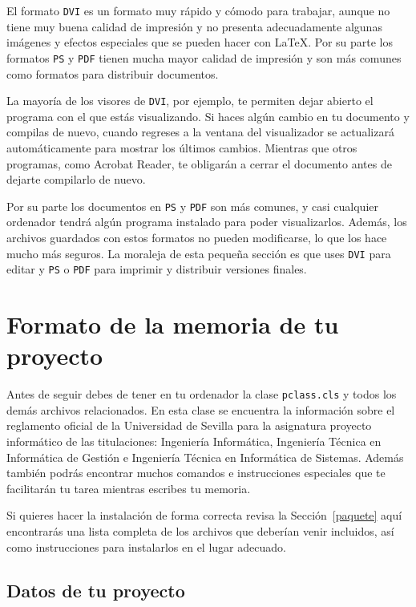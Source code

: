 El formato \texttt{DVI} es un formato muy r\'apido y c\'omodo para trabajar,
aunque no tiene muy buena calidad de impresi\'on y no presenta adecuadamente
algunas im\'agenes y efectos especiales que se pueden hacer con \LaTeX{}.
Por su parte los formatos \texttt{PS} y \texttt{PDF} tienen mucha mayor calidad
de impresi\'on y son m\'as comunes como formatos para distribuir documentos.

La mayor\'ia de los visores de \texttt{DVI}, por ejemplo, te permiten dejar abierto
el programa con el que est\'as visualizando. Si haces alg\'un cambio en tu
documento y compilas de nuevo, cuando regreses a la ventana del visualizador se
actualizar\'a autom\'aticamente para mostrar los \'ultimos cambios. Mientras
que otros programas, como Acrobat Reader, te obligar\'an a cerrar el
documento antes de dejarte compilarlo de nuevo.

Por su parte los documentos en \texttt{PS} y \texttt{PDF} son m\'as comunes, y casi
cualquier ordenador tendr\'a alg\'un programa instalado para poder
visualizarlos. Adem\'as, los archivos guardados con estos formatos no pueden
modificarse, lo que los hace mucho m\'as seguros. La moraleja de esta peque\~na
secci\'on es que uses \texttt{DVI} para editar y \texttt{PS} o \texttt{PDF} para
imprimir y distribuir versiones finales.



\section{Formato de la memoria de tu proyecto}

Antes de seguir debes de tener en tu ordenador la clase \texttt{pclass.cls} y  todos los 
dem\'as archivos relacionados. En esta clase se encuentra la informaci\'on sobre el reglamento oficial de la Universidad de 
Sevilla para la asignatura proyecto inform\'atico de las titulaciones: Ingenier\'ia Inform\'atica, Ingenier\'ia T\'ecnica 
en Inform\'atica de Gesti\'on e Ingenier\'ia T\'ecnica en Inform\'atica de Sistemas. Adem\'as tambi\'en podr\'as encontrar
muchos comandos e instrucciones especiales que te facilitar\'an tu tarea mientras escribes tu memoria.

Si quieres hacer la instalaci\'on de forma correcta revisa la Secci\'on~\ref{paquete} aqu\'i encontrar\'as
una lista completa de los archivos que deber\'ian venir incluidos, as\'i como instrucciones para instalarlos 
en el lugar adecuado.


\subsection{Datos de tu proyecto}

